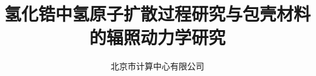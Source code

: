 
\title{氢化锆中氢原子扩散过程研究与包壳材料的辐照动力学研究}
\author[ ]{北京市计算中心有限公司}   %
\renewcommand*{\Authfont}{\small\rm} %
\renewcommand*{\Affilfont}{\small\it} %
\renewcommand\Authands{ and } %
\renewcommand\Authands{ , } %
\date{} %


